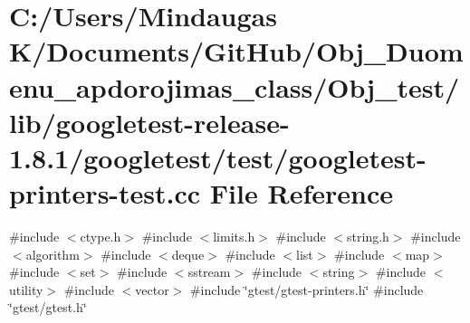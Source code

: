 \hypertarget{_obj__test_2lib_2googletest-release-1_88_81_2googletest_2test_2googletest-printers-test_8cc}{}\section{C\+:/\+Users/\+Mindaugas K/\+Documents/\+Git\+Hub/\+Obj\+\_\+\+Duomenu\+\_\+apdorojimas\+\_\+class/\+Obj\+\_\+test/lib/googletest-\/release-\/1.8.1/googletest/test/googletest-\/printers-\/test.cc File Reference}
\label{_obj__test_2lib_2googletest-release-1_88_81_2googletest_2test_2googletest-printers-test_8cc}
{\ttfamily \#include $<$ctype.\+h$>$}\newline
{\ttfamily \#include $<$limits.\+h$>$}\newline
{\ttfamily \#include $<$string.\+h$>$}\newline
{\ttfamily \#include $<$algorithm$>$}\newline
{\ttfamily \#include $<$deque$>$}\newline
{\ttfamily \#include $<$list$>$}\newline
{\ttfamily \#include $<$map$>$}\newline
{\ttfamily \#include $<$set$>$}\newline
{\ttfamily \#include $<$sstream$>$}\newline
{\ttfamily \#include $<$string$>$}\newline
{\ttfamily \#include $<$utility$>$}\newline
{\ttfamily \#include $<$vector$>$}\newline
{\ttfamily \#include \char`\"{}gtest/gtest-\/printers.\+h\char`\"{}}\newline
{\ttfamily \#include \char`\"{}gtest/gtest.\+h\char`\"{}}\newline
